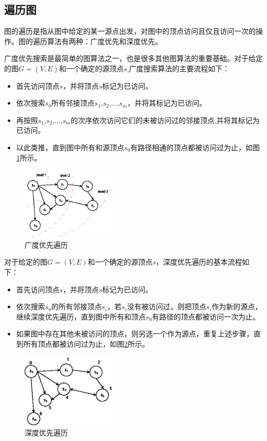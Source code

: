 \subsection{遍历图}
图的遍历是指从图中给定的某一源点出发，对图中的顶点访问且仅且访问一次的操作。图的遍历算法有两种：广度优先和深度优先。

广度优先搜索是最简单的图算法之一，也是很多其他图算法的重要基础。对于给定的图$G=(V,E)$和一个确定的源顶点$s$,广度搜索算法的主要流程如下：
\begin{itemize}
\item 首先访问顶点$s$，并将顶点$s$标记为已访问。
\item 依次搜索$s_0$所有邻接顶点$s_1$,$s_2$,...,$s_m$，并将其标记为已访问。
\item 再按照$s_1$,$s_2$,...,$s_m$的次序依次访问它们的未被访问过的邻接顶点,并将其标记为已访问。
\item 以此类推，直到图中所有和源顶点$s_0$有路径相通的顶点都被访问过为止，如图\ref{fig:graphbfs}所示。
\end{itemize}

\begin{figure}[htbp]
\centering
\includegraphics[width=0.4\textwidth]{myfigures/graphbfs}
\caption{广度优先遍历}\label{fig:graphbfs}
\end{figure}

对于给定的图$G=(V,E)$和一个确定的源顶点$s$，深度优先遍历的基本流程如下：
\begin{itemize}
\item 首先访问顶点$s$，并将顶点$s$标记为已访问。
\item 依次搜索$s_0$的所有邻接顶点$s_i$，若$s_i$没有被访问过，则把顶点$s_i$作为新的源点，继续深度优先遍历，直到图中所有和顶点$s_0$有路径的顶点都被访问一次为止。
\item 如果图中存在其他未被访问的顶点，则另选一个作为源点，重复上述步骤，直到所有顶点都被访问过为止，如图\ref{fig:graphdfs}所示。
\end{itemize}

\begin{figure}[htbp]
\centering
\includegraphics[width=0.4\textwidth]{myfigures/graphdfs}
\caption{深度优先遍历}\label{fig:graphdfs}
\end{figure}

